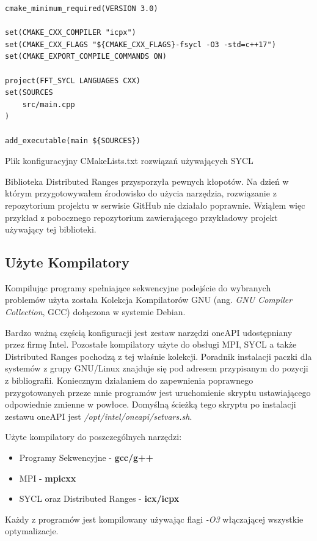\documentclass[a4paper,12pt]{book} %
\begin{document}
\begin{lstfloat}[H]
\begin{lstlisting}[frame=single]
cmake_minimum_required(VERSION 3.0)

set(CMAKE_CXX_COMPILER "icpx")
set(CMAKE_CXX_FLAGS "${CMAKE_CXX_FLAGS}-fsycl -O3 -std=c++17")
set(CMAKE_EXPORT_COMPILE_COMMANDS ON)

project(FFT_SYCL LANGUAGES CXX)
set(SOURCES 
    src/main.cpp
)

add_executable(main ${SOURCES})
\end{lstlisting}
\caption{Plik konfiguracyjny CMakeLists.txt rozwiązań używających SYCL}
\label{lst::cmake-SYCL}
\end{lstfloat}

Biblioteka Distributed Ranges przysporzyła pewnych kłopotów. Na dzień w którym przygotowywałem środowisko do użycia narzędzia, rozwiązanie z repozytorium projektu w serwisie GitHub nie działało poprawnie. Wziąłem więc przykład z pobocznego repozytorium zawierającego przykładowy projekt używający tej biblioteki. \cite{dist-ranges-tutorial}
\subsection{Użyte Kompilatory}
Kompilując programy spełniające sekwencyjne podejście do wybranych problemów użyta została Kolekcja Kompilatorów GNU (ang. \emph{GNU Compiler Collection}, GCC) dołączona w systemie Debian.

Bardzo ważną częścią konfiguracji jest zestaw narzędzi oneAPI udostępniany przez firmę Intel. Pozostałe kompilatory użyte do obsługi MPI, SYCL a także Distributed Ranges pochodzą z tej właśnie kolekcji. Poradnik instalacji paczki dla systemów z grupy GNU/Linux znajduje się pod adresem przypisanym do pozycji \cite{oneapi-install} z bibliografii. Koniecznym działaniem do zapewnienia poprawnego przygotowanych przeze mnie programów jest uruchomienie skryptu ustawiającego odpowiednie zmienne w powłoce. Domyślną ścieżką tego skryptu po instalacji zestawu oneAPI jest \emph{/opt/intel/oneapi/setvars.sh}.

Użyte kompilatory do poszczególnych narzędzi:
\begin{itemize}
\item Programy Sekwencyjne - \textbf{gcc/g++}
\item MPI - \textbf{mpicxx}
\item SYCL oraz Distributed Ranges - \textbf{icx/icpx}
\end{itemize}
Każdy z programów jest kompilowany używając flagi \emph{-O3} włączającej wszystkie optymalizacje.
\end{document}
